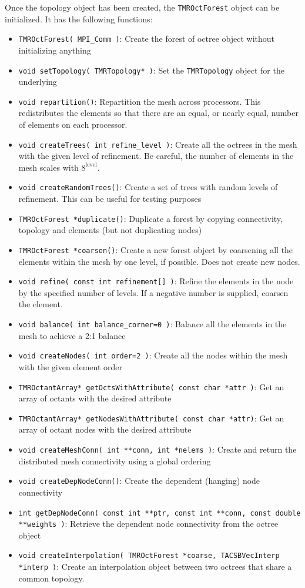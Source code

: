 \documentclass[12pt]{article}
\begin{document}
Once the topology object has been created, the \texttt{TMROctForest} object can be initialized. It has the following functions:
%
\begin{itemize}
\item \texttt{TMROctForest( MPI\_Comm )}: Create the forest of octree object without initializing anything
\item \texttt{void setTopology( TMRTopology* )}: Set the \texttt{TMRTopology} object for the underlying
\item \texttt{void repartition()}: Repartition the mesh across processors. This redistributes the elements so that there are an equal, or nearly equal, number of elements on each processor.
\item \texttt{void createTrees( int refine\_level )}: Create all the octrees in the mesh with the given level of refinement. Be careful, the number of elements in the mesh scales with $8^{\text{level}}$.
\item \texttt{void createRandomTrees()}: Create a set of trees with random levels of refinement. This can be useful for testing purposes
\item \texttt{TMROctForest *duplicate()}: Duplicate a forest by copying connectivity, topology and elements (but not duplicating nodes)
\item \texttt{TMROctForest *coarsen()}: Create a new forest object by coarsening all the elements within the mesh by one level, if possible. Does not create new nodes.
\item \texttt{void refine( const int refinement[] )}: Refine the elements in the node by the specified number of levels. If a negative number is supplied, coarsen the element.
\item \texttt{void balance( int balance\_corner=0 )}: Balance all the elements in the mesh to achieve a 2:1 balance 
\item \texttt{void createNodes( int order=2 )}: Create all the nodes within the mesh with the given element order
\item \texttt{TMROctantArray* getOctsWithAttribute( const char *attr )}: Get an array of octants with the desired attribute
\item \texttt{TMROctantArray* getNodesWithAttribute( const char *attr)}: Get an array of octant nodes with the desired attribute
\item \texttt{void createMeshConn( int **conn, int *nelems )}: Create and return the distributed mesh connectivity using a global ordering
\item \texttt{void createDepNodeConn()}: Create the dependent (hanging) node connectivity
\item \texttt{int getDepNodeConn( const int **ptr, const int **conn, const double **weights )}: Retrieve the dependent node connectivity from the octree object
\item \texttt{void createInterpolation( TMROctForest *coarse, TACSBVecInterp *interp )}: Create an interpolation object between two octrees that share a common topology.
\end{itemize}
\end{document}
